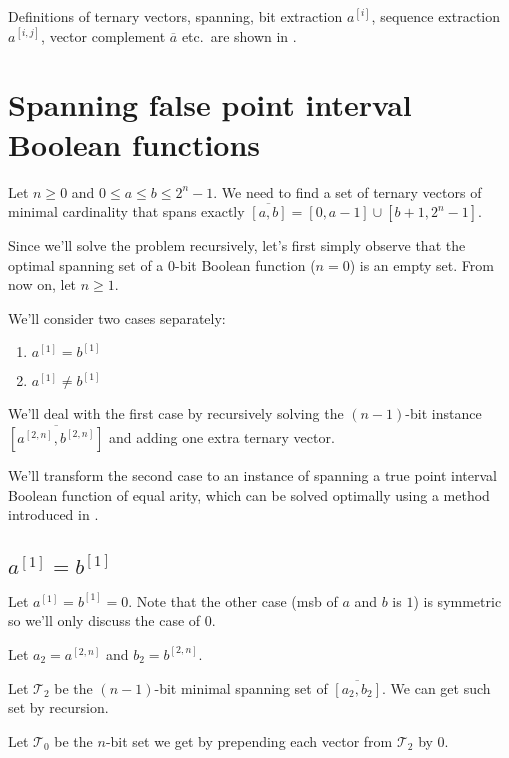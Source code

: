 \documentclass{article}
\theoremstyle{plain}
\theoremstyle{definition}
\newcommand{\interval}[2]{[#1, #2]}
\newcommand{\compl}[1]{\overline{#1}}
\newcommand{\finterval}[2]{\compl{\interval{#1}{#2}}}
\newcommand{\bit}[2]{#1^{[#2]}}
\newcommand{\bits}[3]{#1^{\interval{#2}{#3}}}
\begin{document}

Definitions of
ternary vectors,
spanning,
bit extraction $\bit{a}{i}$,
sequence extraction $\bits{a}{i}{j}$,
vector complement $\compl{a}$
etc.~are shown in \cite{Schieber2005154}.

\section{Spanning false point interval Boolean functions}
Let $n \geq 0$ and $0 \leq a \leq b \leq 2^n - 1$.
We need to find a set of ternary vectors of minimal cardinality
that spans exactly $\finterval{a}{b} = \interval{0}{a-1} \cup \interval{b+1}{2^n - 1}$.

Since we'll solve the problem recursively,
let's first simply observe that the optimal spanning set of a $0$-bit Boolean function ($n = 0$)
is an empty set.
From now on, let $n \geq 1$.

We'll consider two cases separately:

\begin{enumerate}
\item $\bit{a}{1} = \bit{b}{1}$
\item $\bit{a}{1} \neq \bit{b}{1}$
\end{enumerate}

We'll deal with the first case
by recursively solving the $(n-1)$-bit instance $\finterval{\bits{a}{2}{n}}{\bits{b}{2}{n}}$
and adding one extra ternary vector.

We'll transform the second case
to an instance of spanning a true point interval Boolean function
of equal arity,
which can be solved optimally using a method introduced in \cite{Schieber2005154}.

\subsection{\texorpdfstring{$\bit{a}{1} = \bit{b}{1}$}{a[1] = b[1]}}
Let $\bit{a}{1} = \bit{b}{1} = 0$.
Note that the other case (\acrshort{msb} of $a$ and $b$ is $1$)
is symmetric so we'll only discuss the case of $0$.

Let $a_2 = \bits{a}{2}{n}$ and $b_2 = \bits{b}{2}{n}$.

Let $\mathcal{T}_2$ be the $(n-1)$-bit minimal spanning set of $\finterval{a_2}{b_2}$.
We can get such set by recursion.

Let $\mathcal{T}_0$ be the $n$-bit set we get by prepending each vector from $\mathcal{T}_2$ by $0$.
\end{document}
